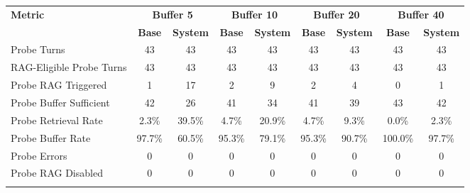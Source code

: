\begin{landscape}
\begin{longtable}{@{}p{3.8cm}cccccccc@{}}
\toprule
\textbf{Metric} & \multicolumn{2}{c}{\textbf{Buffer 5}} & \multicolumn{2}{c}{\textbf{Buffer 10}} & \multicolumn{2}{c}{\textbf{Buffer 20}} & \multicolumn{2}{c}{\textbf{Buffer 40}} \\
\cmidrule(lr){2-3}\cmidrule(lr){4-5}\cmidrule(lr){6-7}\cmidrule(lr){8-9}
 & \textbf{Base} & \textbf{System} & \textbf{Base} & \textbf{System} & \textbf{Base} & \textbf{System} & \textbf{Base} & \textbf{System} \\
\midrule
\endhead
Probe Turns & 43 & 43 & 43 & 43 & 43 & 43 & 43 & 43 \\
RAG-Eligible Probe Turns & 43 & 43 & 43 & 43 & 43 & 43 & 43 & 43 \\
Probe RAG Triggered & 1 & 17 & 2 & 9 & 2 & 4 & 0 & 1 \\
Probe Buffer Sufficient & 42 & 26 & 41 & 34 & 41 & 39 & 43 & 42 \\
Probe Retrieval Rate & 2.3\% & 39.5\% & 4.7\% & 20.9\% & 4.7\% & 9.3\% & 0.0\% & 2.3\% \\
Probe Buffer Rate & 97.7\% & 60.5\% & 95.3\% & 79.1\% & 95.3\% & 90.7\% & 100.0\% & 97.7\% \\
Probe Errors & 0 & 0 & 0 & 0 & 0 & 0 & 0 & 0 \\
Probe RAG Disabled & 0 & 0 & 0 & 0 & 0 & 0 & 0 & 0 \\
\botrule
\end{longtable}
\normalsize
\end{landscape}

